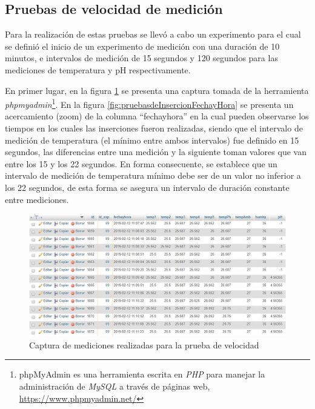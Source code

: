 \subsection{Pruebas de velocidad de medición}
\par
Para la realización de estas pruebas se llevó a cabo un experimento para el cual se definió el inicio de un experimento de medición con una duración de 10 minutos, e intervalos de medición de 15 segundos y 120 segundos para las mediciones de temperatura y pH respectivamente.
\par 
En primer lugar, en la figura \ref{fig:pruebasdeInsercion} se presenta una captura tomada de la herramienta \textit{phpmyadmin}\footnote{phpMyAdmin es una herramienta escrita en \textit{PHP} para manejar la administración de \textit{MySQL} a través de páginas web, \url{https://www.phpmyadmin.net/}}. En la figura \ref{fig:pruebasdeInsercionFechayHora} se presenta un acercamiento (zoom) de la columna ``fechayhora'' en la cual  pueden observarse los tiempos en los cuales las inserciones fueron realizadas, siendo que el intervalo de medición de temperatura (el mínimo entre ambos intervalos) fue definido en 15 segundos, las diferencias entre una medición y la siguiente toman valores que van entre los 15 y los 22 segundos. En forma consecuente, se establece que un intervalo de medición de temperatura mínimo debe ser de un valor no inferior a los 22 segundos, de esta forma se asegura un intervalo de duración constante entre mediciones.
\begin{figure}[H]
    \centering
    \includegraphics[scale=0.5]{Pruebas/Inserciones.jpg}
    \caption{Captura de mediciones realizadas para la prueba de velocidad}
    \label{fig:pruebasdeInsercion}
\end{figure}

